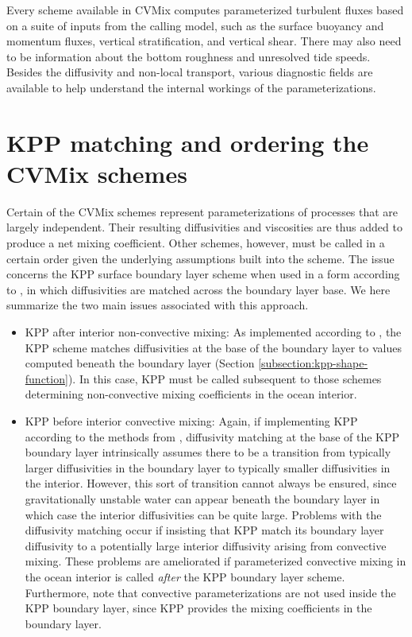 Every scheme available in CVMix computes parameterized turbulent
fluxes based on a suite of inputs from the calling model, such as the
surface buoyancy and momentum fluxes, vertical stratification, and
vertical shear.  There may also need to be information about the
bottom roughness and unresolved tide speeds.  Besides the diffusivity
and non-local transport, various diagnostic fields are available to
help understand the internal workings of the parameterizations.



\section{KPP matching and ordering the CVMix schemes}
\label{section:vert_mix_schemes_ordering_cvmix}

Certain of the CVMix schemes represent parameterizations of processes
that are largely independent.  Their resulting diffusivities and
viscosities are thus added to produce a net mixing coefficient.  Other
schemes, however, must be called in a certain order given the
underlying assumptions built into the scheme.  The issue concerns the
KPP surface boundary layer scheme when used in a form according to
\cite{LargeKPP}, in which diffusivities are matched across the
boundary layer base.  We here summarize the two main issues associated
with this approach.
\begin{itemize}
\item {\sc KPP after interior non-convective mixing}: As implemented
  according to \cite{LargeKPP}, the KPP scheme matches diffusivities
  at the base of the boundary layer to values computed beneath the
  boundary layer (Section \ref{subsection:kpp-shape-function}).  In
  this case, KPP must be called subsequent to those schemes
  determining non-convective mixing coefficients in the ocean
  interior.  

\item {\sc KPP before interior convective mixing}: Again, if
  implementing KPP according to the methods from \cite{LargeKPP},
  diffusivity matching at the base of the KPP boundary layer
  intrinsically assumes there to be a transition from typically larger
  diffusivities in the boundary layer to typically smaller
  diffusivities in the interior.  However, this sort of transition
  cannot always be ensured, since gravitationally unstable water can
  appear beneath the boundary layer in which case the interior
  diffusivities can be quite large.  Problems with the diffusivity
  matching occur if insisting that KPP match its boundary layer
  diffusivity to a potentially large interior diffusivity arising from
  convective mixing.  These problems are ameliorated if parameterized
  convective mixing in the ocean interior is called {\it after} the
  KPP boundary layer scheme.  Furthermore, note that convective
  parameterizations are not used inside the KPP boundary layer, since
  KPP provides the mixing coefficients in the boundary layer.

\end{itemize}

